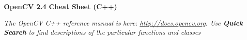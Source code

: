 \documentclass[10pt,landscape]{article}
\makeatletter
\renewcommand{\section}{\@startsection{section}{1}{0mm}%
                                {-1ex plus -.5ex minus -.2ex}%
                                {0.5ex plus .2ex}%
                                {\normalfont\large\bfseries}}
\makeatother
\begin{document}
\raggedright
\footnotesize
\begin{multicols}{3}


\setlength{\premulticols}{1pt}
\setlength{\postmulticols}{1pt}
\setlength{\multicolsep}{1pt}
\setlength{\columnsep}{2pt}

\begin{center}
     \Large{\textbf{OpenCV 2.4 Cheat Sheet (C++)}} \\
\end{center}
\newlength{\MyLen}


\emph{The OpenCV C++ reference manual is here: \url{http://docs.opencv.org}. Use \textbf{Quick Search} to find descriptions of the particular functions and classes}


\end{multicols}
\end{document}
